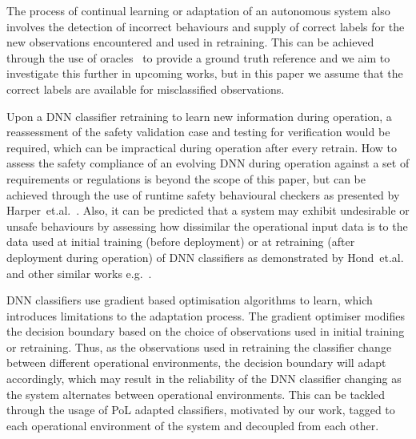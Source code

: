 The process of continual learning or adaptation of an autonomous system also involves the detection of incorrect behaviours and supply of correct labels for the new observations encountered and used in retraining. 
%
This can be achieved through the use of oracles~\cite{Barr2015,Zhang2020} to provide a ground truth reference and we aim to investigate this further in upcoming works, but in this paper we assume that the correct labels are available for misclassified observations.

Upon a DNN classifier retraining to learn new information during operation, a reassessment of the safety validation case and testing for verification would be required, which can be impractical during operation after every retrain.  
%
How to assess the safety compliance of an evolving DNN during operation against a set of requirements or regulations is beyond the scope of this paper, but can be achieved through the use of runtime safety behavioural checkers as presented by Harper~et.al.~\cite{harper2021safety}. 
%
Also, it can be predicted that a system may exhibit undesirable or unsafe behaviours by assessing how dissimilar the operational input data is to the data used at initial training (before deployment) or at retraining (after deployment during operation) of DNN classifiers as demonstrated by\textbf{} Hond~et.al.~\cite{Hond2020} and other similar works e.g.~\cite{Schaffer2017, Mandelbaum2017, Xing2019}. 

DNN classifiers use gradient based optimisation algorithms to learn, which introduces limitations to the adaptation process. 
%
    The gradient optimiser modifies the decision boundary based on the choice of observations used in initial training or retraining. 
    Thus, as the observations used in retraining the classifier change between different operational environments, the decision boundary will adapt accordingly, which may result in the reliability of the DNN classifier changing as the system alternates between operational environments. 
    This can be tackled through the usage of PoL adapted classifiers, motivated by our work, tagged to each operational environment of the system and decoupled from each other. 
    
